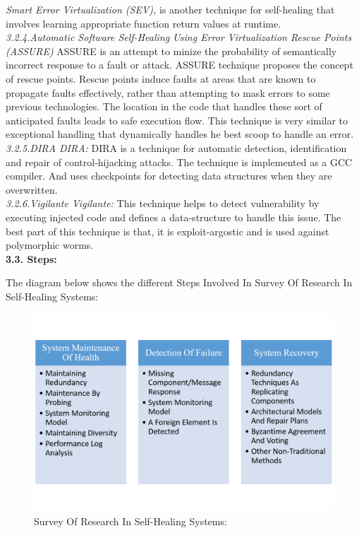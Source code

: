 \textit{Smart Error Virtualization (SEV),} is another technique for self-healing that involves learning appropriate function return values at runtime.\\

\textit{3.2.4.Automatic Software Self-Healing Using Error Virtualization Rescue Points (ASSURE)}
ASSURE is an attempt to minize the probability of semantically incorrect response to a fault or attack. ASSURE technique proposes the concept of rescue points. Rescue points induce faults at areas that are known to propagate faults effectively, rather than attempting to mask errors to some previous technologies. The location in the code that handles these sort of anticipated faults leads to safe execution flow. This technique is very similar to exceptional handling that dynamically handles he best scoop to handle an error.\\

\textit{3.2.5.DIRA DIRA:}
DIRA is a technique for automatic detection, identification and repair of control-hijacking attacks. The technique is implemented as a GCC compiler. And uses checkpoints for detecting data structures when they are overwritten.\\

\textit{3.2.6.Vigilante Vigilante:}
This technique helps to detect vulnerability by executing injected code and defines a data-structure to handle this issue. The best part of this technique is that, it is exploit-argostic and is used against polymorphic worms.\\

\textbf{3.3. Steps:\\}

The diagram below shows the different Steps Involved In Survey Of Research In Self-Healing Systems:

\begin{figure}[H]
\includegraphics[width=5in]{img/SurveyofSelfHeaingResearch}
\caption{Survey Of Research In Self-Healing Systems:}
\end{figure}



